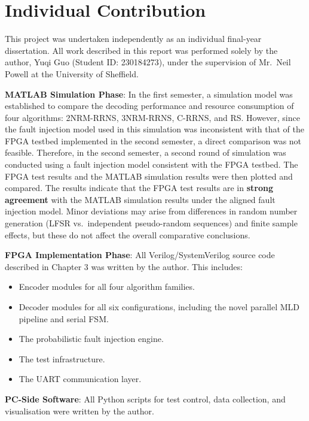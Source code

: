 \documentclass[
  english,
  12pt,
]{report}
\providecommand{\tightlist}{%
  \setlength{\itemsep}{0pt}\setlength{\parskip}{0pt}}
\begin{document}
\chapter{Individual Contribution}\label{individual-contribution}

This project was undertaken independently as an individual final-year
dissertation. All work described in this report was performed solely by
the author, Yuqi Guo (Student ID: 230184273), under the supervision of
Mr.~Neil Powell at the University of Sheffield.

\textbf{MATLAB Simulation Phase}: In the first semester, a simulation
model was established to compare the decoding performance and resource
consumption of four algorithms: 2NRM-RRNS, 3NRM-RRNS, C-RRNS, and RS.
However, since the fault injection model used in this simulation was
inconsistent with that of the FPGA testbed implemented in the second
semester, a direct comparison was not feasible. Therefore, in the second
semester, a second round of simulation was conducted using a fault
injection model consistent with the FPGA testbed. The FPGA test results
and the MATLAB simulation results were then plotted and compared. The
results indicate that the FPGA test results are in \textbf{strong
agreement} with the MATLAB simulation results under the aligned fault
injection model. Minor deviations may arise from differences in random
number generation (LFSR vs.~independent pseudo-random sequences) and
finite sample effects, but these do not affect the overall comparative
conclusions.

\textbf{FPGA Implementation Phase}: All Verilog/SystemVerilog source
code described in Chapter 3 was written by the author. This includes:

\begin{itemize}
\tightlist
\item
  Encoder modules for all four algorithm families.
\item
  Decoder modules for all six configurations, including the novel
  parallel MLD pipeline and serial FSM.
\item
  The probabilistic fault injection engine.
\item
  The test infrastructure.
\item
  The UART communication layer.
\end{itemize}

\textbf{PC-Side Software}: All Python scripts for test control, data
collection, and visualisation were written by the author.
\end{document}
